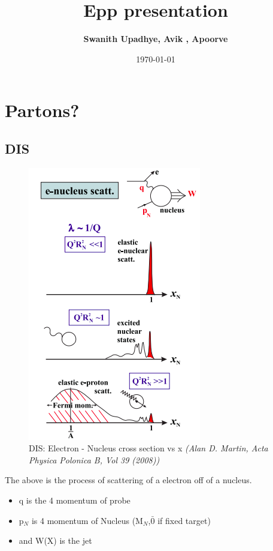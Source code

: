 \documentclass[11pt]{article}
\title{Epp presentation}
\author{\textbf{\Large Swanith Upadhye, Avik , Apoorve}}
\date{\today}
\begin{document}
	
	\maketitle
	\noindent\hrulefill
	\Large
	
	\section{Partons?}
	\subsection{DIS}
	
	\begin{figure}[h]
		\centering\includegraphics[scale=0.7]{1.png}
		\caption{\centering DIS: Electron - Nucleus cross section vs x \newline \textit{(Alan D. Martin, Acta Physica Polonica B, Vol 39 (2008))}} 
		\label{fig:figure1}
	\end{figure}
	
	The above is the process of scattering of a electron off of a nucleus. 
	\begin{itemize}
		\item q is the 4 momentum of probe
		\item p$_N$ is 4 momentum of Nucleus (M$_N$,$\bar{0}$ if fixed target)
		\item and W(X) is the jet
	\end{itemize}
	
\end{document}
